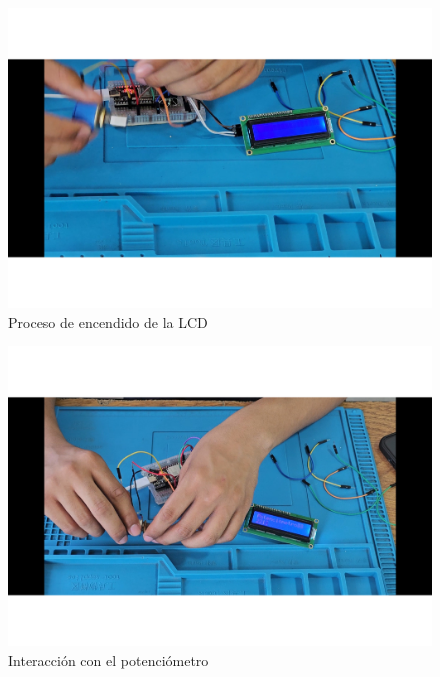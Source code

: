     
    \begin{figure}[H]
        \centering
        \includegraphics[trim =  {25mm 25mm 25mm 10mm},clip,scale=0.3]{22/Img/e12.pdf}
        \caption{Proceso de encendido de la LCD}
        \label{fig:evi5}
    \end{figure}
    
    
    \begin{figure}[H]
        \centering
        \includegraphics[trim = {25mm 25mm 25mm 10mm},clip,scale=0.3]{22/Img/e15.pdf}
        \caption{Interacción con el potenciómetro}
        \label{fig:evi6}
    \end{figure}
    
